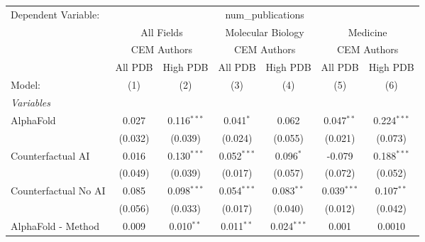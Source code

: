 \begingroup
\centering
\begin{tabular}{lcccccc}
   \tabularnewline \midrule \midrule
   Dependent Variable: & \multicolumn{6}{c}{num\_publications}\\
 & \multicolumn{2}{c}{All Fields} & \multicolumn{2}{c}{Molecular Biology} & \multicolumn{2}{c}{Medicine} \\
\cmidrule(lr){2-3} \cmidrule(lr){4-5} \cmidrule(lr){6-7}
 & \multicolumn{2}{c}{CEM Authors} & \multicolumn{2}{c}{CEM Authors} & \multicolumn{2}{c}{CEM Authors} \\
\cmidrule(lr){2-3} \cmidrule(lr){4-5} \cmidrule(lr){6-7}
 & \multicolumn{1}{c}{All PDB} & \multicolumn{1}{c}{High PDB} & \multicolumn{1}{c}{All PDB} & \multicolumn{1}{c}{High PDB} & \multicolumn{1}{c}{All PDB} & \multicolumn{1}{c}{High PDB} \\
\cmidrule(lr){2-2} \cmidrule(lr){3-3} \cmidrule(lr){4-4} \cmidrule(lr){5-5} \cmidrule(lr){6-6} \cmidrule(lr){7-7}
   Model:                                                     & (1)           & (2)            & (3)           & (4)           & (5)           & (6)\\  
   \midrule
   \emph{Variables}\\
   AlphaFold                                                  & 0.027         & 0.116$^{***}$  & 0.041$^{*}$   & 0.062         & 0.047$^{**}$  & 0.224$^{***}$\\   
                                                              & (0.032)       & (0.039)        & (0.024)       & (0.055)       & (0.021)       & (0.073)\\   
   Counterfactual AI                                          & 0.016         & 0.130$^{***}$  & 0.052$^{***}$ & 0.096$^{*}$   & -0.079        & 0.188$^{***}$\\   
                                                              & (0.049)       & (0.039)        & (0.017)       & (0.057)       & (0.072)       & (0.052)\\   
   Counterfactual No AI                                       & 0.085         & 0.098$^{***}$  & 0.054$^{***}$ & 0.083$^{**}$  & 0.039$^{***}$ & 0.107$^{**}$\\   
                                                              & (0.056)       & (0.033)        & (0.017)       & (0.040)       & (0.012)       & (0.042)\\   
   AlphaFold - Method                                         & 0.009         & 0.010$^{**}$   & 0.011$^{**}$  & 0.024$^{***}$ & 0.001         & 0.0010\\   

\end{tabular}
